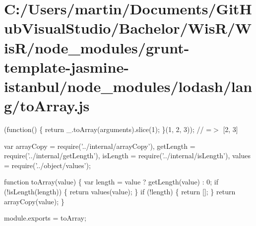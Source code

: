 \hypertarget{_c_1_2_users_2martin_2_documents_2_git_hub_visual_studio_2_bachelor_2_wis_r_2_wis_r_2node_modulef400d8b67b114536f53ee203530ce33a}{}\section{C\+:/\+Users/martin/\+Documents/\+Git\+Hub\+Visual\+Studio/\+Bachelor/\+Wis\+R/\+Wis\+R/node\+\_\+modules/grunt-\/template-\/jasmine-\/istanbul/node\+\_\+modules/lodash/lang/to\+Array.\+js}
(function() \{ return \+\_\+.\+to\+Array(arguments).slice(1); \}(1, 2, 3)); // =$>$ \mbox{[}2, 3\mbox{]}


\begin{DoxyCodeInclude}
var arrayCopy = require(\textcolor{stringliteral}{'../internal/arrayCopy'}),
    getLength = require(\textcolor{stringliteral}{'../internal/getLength'}),
    isLength = require(\textcolor{stringliteral}{'../internal/isLength'}),
    values = require(\textcolor{stringliteral}{'../object/values'});

\textcolor{keyword}{function} toArray(value) \{
  var length = value ? getLength(value) : 0;
  \textcolor{keywordflow}{if} (!isLength(length)) \{
    \textcolor{keywordflow}{return} values(value);
  \}
  \textcolor{keywordflow}{if} (!length) \{
    \textcolor{keywordflow}{return} [];
  \}
  \textcolor{keywordflow}{return} arrayCopy(value);
\}

module.exports = toArray;
\end{DoxyCodeInclude}
 
